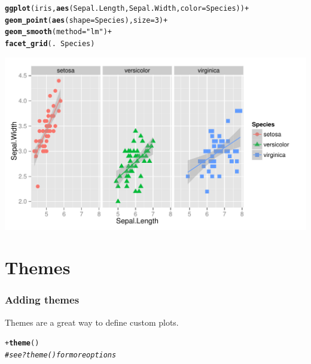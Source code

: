\documentclass{beamer}\usepackage[]{graphicx}\usepackage[]{color}
\makeatletter
\newcommand{\hlnum}[1]{\textcolor[rgb]{0.686,0.059,0.569}{#1}}%
\newcommand{\hlstr}[1]{\textcolor[rgb]{0.192,0.494,0.8}{#1}}%
\newcommand{\hlcom}[1]{\textcolor[rgb]{0.678,0.584,0.686}{\textit{#1}}}%
\newcommand{\hlopt}[1]{\textcolor[rgb]{0,0,0}{#1}}%
\newcommand{\hlstd}[1]{\textcolor[rgb]{0.345,0.345,0.345}{#1}}%
\newcommand{\hlkwc}[1]{\textcolor[rgb]{0.333,0.667,0.333}{#1}}%
\newcommand{\hlkwd}[1]{\textcolor[rgb]{0.737,0.353,0.396}{\textbf{#1}}}%
\newenvironment{kframe}{%
 \def\at@end@of@kframe{}%
 \ifinner\ifhmode%
  \def\at@end@of@kframe{\end{minipage}}%
  \begin{minipage}{\columnwidth}%
 \fi\fi%
 \def\FrameCommand##1{\hskip\@totalleftmargin \hskip-\fboxsep
 \colorbox{shadecolor}{##1}\hskip-\fboxsep
     \hskip-\linewidth \hskip-\@totalleftmargin \hskip\columnwidth}%
 \MakeFramed {\advance\hsize-\width
   \@totalleftmargin\z@ \linewidth\hsize
   \@setminipage}}%
 {\par\unskip\endMakeFramed%
 \at@end@of@kframe}
\newenvironment{knitrout}{}{} %
\makeatother
\begin{document}
\begin{frame}[fragile]
\begin{knitrout}\footnotesize
{}\color{fgcolor}\begin{kframe}
\begin{alltt}
\hlkwd{ggplot}\hlstd{(iris,} \hlkwd{aes}\hlstd{(Sepal.Length, Sepal.Width,} \hlkwc{color} \hlstd{= Species))} \hlopt{+}
    \hlkwd{geom_point}\hlstd{(}\hlkwd{aes}\hlstd{(}\hlkwc{shape} \hlstd{= Species),} \hlkwc{size} \hlstd{=} \hlnum{3}\hlstd{)} \hlopt{+}
    \hlkwd{geom_smooth}\hlstd{(}\hlkwc{method} \hlstd{=} \hlstr{"lm"}\hlstd{)} \hlopt{+}
    \hlkwd{facet_grid}\hlstd{(.} \hlopt{~} \hlstd{Species)}
\end{alltt}
\end{kframe}

{\centering \includegraphics[width=.75\linewidth]{figure/adding_stats2_} 

}



\end{knitrout}
\end{frame}


\section*{Themes}
\frame{\sectionpage}


\begin{frame}[fragile]
\frametitle{Adding themes}
Themes are a great way to define custom plots.
\begin{knitrout}\footnotesize
{}\color{fgcolor}\begin{kframe}
\begin{alltt}
\hlopt{+} \hlkwd{theme}\hlstd{()}
\hlcom{# see ?theme() for more options}
\end{alltt}
\end{kframe}
\end{knitrout}
\end{frame}
\end{document}
